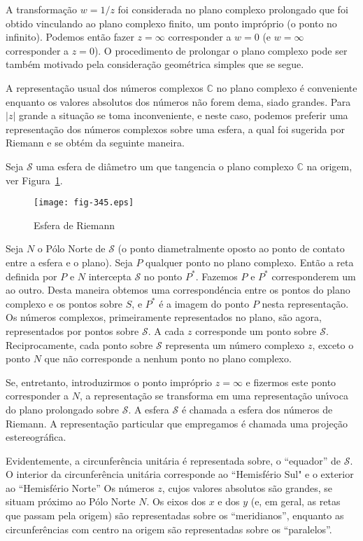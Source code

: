 A transforma\c{c}\~{a}o $w = 1/z$ foi considerada  no plano complexo
prolongado que foi obtido vinculando ao plano complexo finito, um
ponto impr\'{o}prio (o ponto no infinito). Podemos ent\~{a}o fazer $z
=\infty$ corresponder a $w = 0$ (e $w =\infty$ corresponder a $z =
0$). O procedimento de prolongar o plano complexo pode ser tamb\'{e}m
motivado pela considera\c{c}\~{a}o geom\'{e}trica simples que se segue.

A representa\c{c}\~{a}o usual dos n\'{u}meros complexos $\mathbb{C}$ no plano
complexo \'{e} conveniente enquanto os valores absolutos dos n\'{u}meros
n\~{a}o forem dema, siado grandes. Para $| z |$ grande a situa\c{c}\~{a}o se
toma inconveniente, e neste caso, podemos preferir uma
representa\c{c}\~{a}o dos n\'{u}meros complexos sobre uma esfera, a qual foi
sugerida por Riemann e se obt\'{e}m da seguinte maneira.

Seja $\mathcal{S}$ uma esfera de di\^{a}metro um que tangencia o plano
complexo $ \mathbb{C} $ na origem, ver Figura~\ref{fig-345}.
\begin{figure}[H]
\centering
\texttt{[image: fig-345.eps]}
\caption{Esfera de Riemann} \label{fig-345}
\end{figure}

Seja $N$ o P\'{o}lo Norte de $\mathcal{S}$ (o ponto diametralmente
oposto ao ponto de contato entre a esfera e o plano). Seja $P$
qualquer ponto no plano complexo. Ent\~{a}o a reta definida por $P$ e
$N$ intercepta $\mathcal{S}$ no ponto $P^*$. Fazemos $P$ e $P^*$
corresponderem um ao outro. Desta maneira obtemos uma
correspond\'{e}ncia entre os pontos do plano complexo e os pontos
sobre $S$, e $P^*$ \'{e} a imagem do ponto $P$ nesta representa\c{c}\~{a}o. Os
n\'{u}meros complexos, primeiramente representados no plano, s\~{a}o
agora, representados por pontos sobre $\mathcal{S}$. A cada $z$
corresponde um ponto sobre $\mathcal{S}$. Reciprocamente, cada
ponto sobre $\mathcal{S}$ representa um n\'{u}mero complexo $z$,
exceto o ponto $N$ que n\~{a}o corresponde a nenhum ponto no plano
complexo.

Se, entretanto, introduzirmos o ponto impr\'{o}prio $z
=\infty$  e fizermos este ponto corresponder a $N$, a
representa\c{c}\~{a}o se transforma em uma representa\c{c}\~{a}o un\'{\i}voca do plano
prolongado sobre $\mathcal{S}$. A esfera $\mathcal{S}$ \'{e} chamada a
esfera dos n\'{u}meros de Riemann. A representa\c{c}\~{a}o particular que
empregamos \'{e} chamada uma proje\c{c}\~{a}o estereogr\'{a}fica.

Evidentemente, a circunfer\^{e}ncia unit\'{a}ria \'{e} representada sobre, o
``equador'' de $\mathcal{S}$. O interior da circunfer\^{e}ncia unit\'{a}ria
corresponde ao ``Hemisf\'{e}rio Sul" e o exterior ao ``Hemisf\'{e}rio
Norte'' Os n\'{u}meros $z$, cujos valores absolutos s\~{a}o grandes, se
situam pr\'{o}ximo ao P\'{o}lo Norte $N$. Os eixos dos $x$ e dos $y$ (e,
em geral, as retas que passam pela origem) s\~{a}o representadas sobre
os ``meridianos'', enquanto as circunfer\^{e}ncias com centro na origem
s\~{a}o representadas sobre os ``paralelos''.

